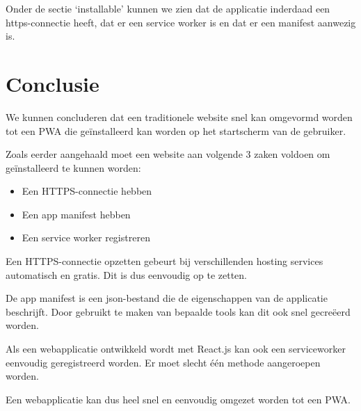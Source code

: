 	Onder de sectie ‘installable’ kunnen we zien dat de applicatie inderdaad een https-connectie heeft, dat er een service worker is en dat er een manifest aanwezig is.
	
	
	
\section{Conclusie}

	We kunnen concluderen dat een traditionele website snel kan omgevormd worden tot een PWA die geïnstalleerd kan worden op het startscherm van de gebruiker. 
	
	Zoals eerder aangehaald moet een website aan volgende 3 zaken voldoen om geïnstalleerd te kunnen worden:
	\begin{itemize}
		\item Een HTTPS-connectie hebben
		\item Een app manifest hebben
		\item Een service worker registreren
	\end{itemize}	
	
	Een HTTPS-connectie opzetten gebeurt bij verschillenden hosting services automatisch en gratis. Dit is dus eenvoudig op te zetten.
	
	De app manifest is een json-bestand die de eigenschappen van de applicatie beschrijft. Door gebruikt te maken van bepaalde tools kan dit ook snel gecreëerd worden.
	
	Als een webapplicatie ontwikkeld wordt met React.js kan ook een serviceworker eenvoudig geregistreerd worden. Er moet slecht één methode aangeroepen worden.
	
	Een webapplicatie kan dus heel snel en eenvoudig omgezet worden tot een PWA.
